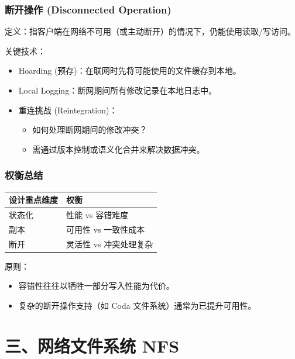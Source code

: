 \subsubsection{断开操作 (Disconnected Operation)}
定义：指客户端在网络不可用（或主动断开）的情况下，仍能使用读取/写访问。

关键技术：
\begin{itemize}
    \item Hoarding (预存)：在联网时先将可能使用的文件缓存到本地。
    \item Local Logging：断网期间所有修改记录在本地日志中。
    \item 重连挑战 (Reintegration)：
    \begin{itemize}
        \item 如何处理断网期间的修改冲突？
        \item 需通过版本控制或语义化合并来解决数据冲突。
    \end{itemize}
\end{itemize}

\subsubsection{权衡总结}
\begin{center}
\begin{tabular}{ll}
\toprule
设计重点维度 & 权衡 \\
\midrule
状态化 & 性能 vs 容错难度 \\
副本 & 可用性 vs 一致性成本 \\
断开 & 灵活性 vs 冲突处理复杂 \\
\bottomrule
\end{tabular}
\end{center}

原则：
\begin{itemize}
    \item 容错性往往以牺牲一部分写入性能为代价。
    \item 复杂的断开操作支持（如 Coda 文件系统）通常为已提升可用性。
\end{itemize}

\section{三、网络文件系统 NFS}

